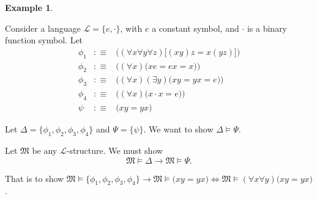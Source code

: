 \documentclass[11pt,letterpaper]{book}
\theoremstyle{definition}
\newtheorem{example}{Example}[section]
\begin{document}
\begin{example}\label{example:logical_imply}

Consider a language $\mathcal{L} = \{ e, \cdot \}$, with $e$ a constant
symbol, and $\cdot$ is a binary function symbol.
Let
\begin{eqnarray*}
\phi_1 & :\equiv & \Big( (\forall x \forall y \forall z) \big[ (x y)z =
x(y z) \big] \Big) \\
\phi_2 & :\equiv & \Big( (\forall x) \big( x e = e x = x \big) \Big) \\
\phi_3 & :\equiv & \Big( (\forall x) (\exists y ) \big( x y = y x = e
\big) \Big) \\
\phi_4 & :\equiv & \Big( (\forall x ) \big( x \cdot x = e \big) \Big) \\
\psi & :\equiv & \Big( x y = y x \Big)
\end{eqnarray*}


Let $\Delta = \{ \phi_1, \phi_2, \phi_3, \phi_4 \}$ and $\Psi = \{ \psi
\}$. We want to show $\Delta \models \Psi$.

Let $\mathfrak{M}$ be any $\mathcal{L}$-structure. We must show $$
\mathfrak{M} \models \Delta  \rightarrow \mathfrak{M} \models \Psi . $$

That is to show $\mathfrak{M} \models \{ \phi_1, \phi_2, \phi_3, \phi_4
\} \rightarrow  \mathfrak{M} \models \Big( x y = y x \Big) \iff
\mathfrak{M} \models (\forall x \forall y) \Big( xy = yx \Big)$.


\end{example}
\end{document}
